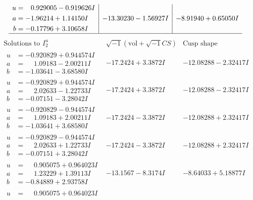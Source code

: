 \documentclass[1p]{elsarticle_modified}
\theoremstyle{definition}
\newcommand{\I}{\sqrt{-1}}
\begin{document}
$$\begin{array}{c|c|c}
\begin{aligned}
u &= \phantom{-}0.929005 - 0.919626 I \\
a &= -1.96214 + 1.14150 I \\
b &= -0.17796 + 3.10658 I\end{aligned}
 & -13.30230 - 1.56927 I & -8.91940 + 0.65050 I\\
 \hline 
 \end{array}$$\newpage$$\begin{array}{c|c|c}  
\text{Solutions to }I^u_{2}& \I (\text{vol} + \sqrt{-1}CS) & \text{Cusp shape}\\
 \hline 
\begin{aligned}
u &= -0.920829 + 0.944574 I \\
a &= \phantom{-}1.09183 - 2.00211 I \\
b &= -1.03641 - 3.68580 I\end{aligned}
 & -17.2424 + 3.3872 I & -12.08288 - 2.32417 I \\ \hline\begin{aligned}
u &= -0.920829 + 0.944574 I \\
a &= \phantom{-}2.02633 - 1.22733 I \\
b &= -0.07151 - 3.28042 I\end{aligned}
 & -17.2424 + 3.3872 I & -12.08288 - 2.32417 I \\ \hline\begin{aligned}
u &= -0.920829 - 0.944574 I \\
a &= \phantom{-}1.09183 + 2.00211 I \\
b &= -1.03641 + 3.68580 I\end{aligned}
 & -17.2424 - 3.3872 I & -12.08288 + 2.32417 I \\ \hline\begin{aligned}
u &= -0.920829 - 0.944574 I \\
a &= \phantom{-}2.02633 + 1.22733 I \\
b &= -0.07151 + 3.28042 I\end{aligned}
 & -17.2424 - 3.3872 I & -12.08288 + 2.32417 I \\ \hline\begin{aligned}
u &= \phantom{-}0.905075 + 0.964023 I \\
a &= \phantom{-}1.23229 + 1.39113 I \\
b &= -0.84889 + 2.93758 I\end{aligned}
 & -13.1567 - 8.3174 I & -8.64033 + 5.18877 I \\ \hline\begin{aligned}
u &= \phantom{-}0.905075 + 0.964023 I \\

\end{aligned}
\end{array}$$
\end{document}
